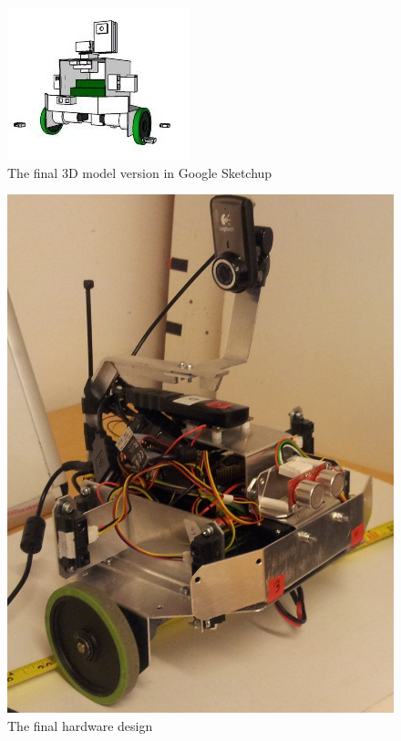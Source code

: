 \begin{figure}[h!]
\label{fig:google_sketchup_draw1}
    \begin{centering}
   	 \includegraphics[scale=1.0]{figures/g_sketchup_v7.jpeg}
   	 \caption{The final 3D model version in Google Sketchup}\label{fig:google_sketchup_draw1}
    \end{centering}
\end{figure}


\begin{figure}[h!]
\label{fig:amee_final}
    \begin{centering}
   	 \includegraphics[scale=0.1]{figures/amee_final.jpg}
   	 \caption{The final hardware design}\label{fig:amee_final}
    \end{centering}
\end{figure}

